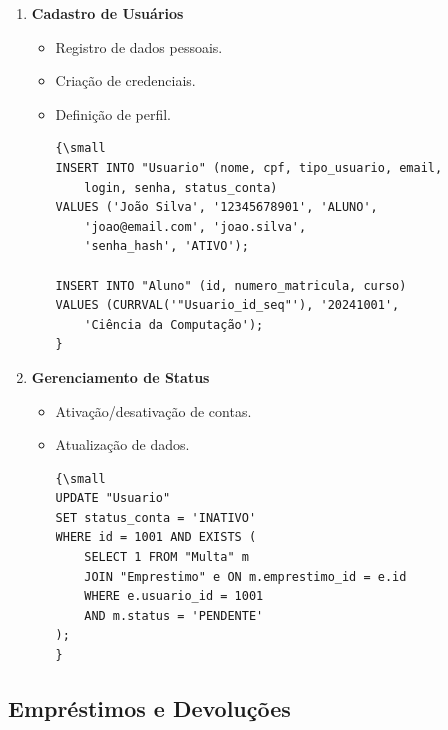 \documentclass[12pt,a4paper]{article}
\begin{document}
\begin{tcolorbox}[title=Operações de Usuários]
\begin{enumerate}[label=\textbf{OU\arabic*.}]
    \item \textbf{Cadastro de Usuários}
    \begin{itemize}
        \item Registro de dados pessoais.
        \item Criação de credenciais.
        \item Definição de perfil.
        \begin{verbatim}
{\small
INSERT INTO "Usuario" (nome, cpf, tipo_usuario, email,
    login, senha, status_conta)
VALUES ('João Silva', '12345678901', 'ALUNO',
    'joao@email.com', 'joao.silva',
    'senha_hash', 'ATIVO');

INSERT INTO "Aluno" (id, numero_matricula, curso)
VALUES (CURRVAL('"Usuario_id_seq"'), '20241001',
    'Ciência da Computação');
}
        \end{verbatim}
    \end{itemize}

    \item \textbf{Gerenciamento de Status}
    \begin{itemize}
        \item Ativação/desativação de contas.
        \item Atualização de dados.
        \begin{verbatim}
{\small
UPDATE "Usuario"
SET status_conta = 'INATIVO'
WHERE id = 1001 AND EXISTS (
    SELECT 1 FROM "Multa" m
    JOIN "Emprestimo" e ON m.emprestimo_id = e.id
    WHERE e.usuario_id = 1001
    AND m.status = 'PENDENTE'
);
}
        \end{verbatim}
    \end{itemize}
\end{enumerate}
\end{tcolorbox}

\subsection{Empréstimos e Devoluções}
\end{document}

